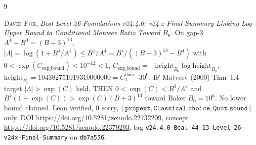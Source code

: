 \documentclass[12pt]{amsart}
\begin{document}
\begin{thebibliography}{9}

\textsc{David Fox},
\emph{Beal Level 26 Foundations v24.4.0: v24.x Final Summary
Linking Log Upper Bound to Conditional Matveev Ratio Toward $B_0$}.
On gap-3 $A^4+B^4=(B+3)^{13}$,
$|\Lambda|=\log(1+B^4/A^4)\le B^4/A^4=B^4/((B+3)^{13}-B^4)$
with $0<\exp(C_{\mathrm{exp\_bound}})<10^{-12}<1$,
$C_{\mathrm{exp\_bound}}=-\mathrm{height}_{B_0}\log\mathrm{height}_{B_0}$,
$\mathrm{height}_{B_0}=104382751019310000000=C_1^{\mathrm{floor}}\cdot 30^6$.
IF Matveev (2000) Thm~1.4 target $|\Lambda|>\exp(C)$ held, THEN
$0<\exp(C)<B^4/A^4$ and
$B^4(1+\exp(C))>\exp(C)(B+3)^{13}$ toward Baker $B_0=10^6$.
No lower bound claimed.
Lean verified, $0$ sorry,
$[\texttt{propext},\texttt{Classical.choice},\texttt{Quot.sound}]$ only.
DOI \url{https://doi.org/10.5281/zenodo.22732209},
concept \url{https://doi.org/10.5281/zenodo.22379293},
tag \texttt{v24.4.0-Beal-44-13-Level-26-v24x-Final-Summary}
on \texttt{db7a556}.

\end{thebibliography}
\end{document}
